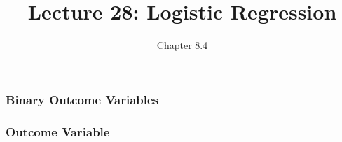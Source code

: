 \documentclass[slides]{beamer}
\title{Lecture 28: Logistic Regression}
\author{Chapter 8.4}
\date{}
\newcommand{\blue}[1]{\textcolor{blue2}{#1}}
\begin{document}
\begin{frame}
\titlepage
\end{frame}


%
%
%
%
%
%
%


\begin{frame}[fragile]
\frametitle{Binary Outcome Variables}

%
%
%

\end{frame}


\begin{frame}[fragile]
\frametitle{Outcome Variable}

%
%
%
%
%

\end{frame}
\end{document}
